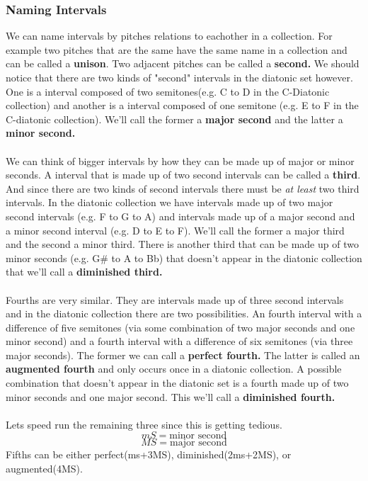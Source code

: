 \documentclass{article}
\begin{document}
\subsubsection{Naming Intervals}
We can name intervals by pitches relations to eachother in a collection. For example two pitches that are the same have the same name in a collection and can be called a \textbf{unison}. Two adjacent pitches can be called a \textbf{second.} We should notice that there are two kinds of "second" intervals in the diatonic set however. One is a interval composed of two semitones(e.g. C to D in the C-Diatonic collection) and another is a interval composed of one semitone (e.g. E to F in the C-diatonic collection). We'll call the former a \textbf{major second} and the latter a \textbf{minor second.}\\
\\We can think of bigger intervals by how they can be made up of major or minor seconds. A interval that is made up of two second intervals can be called a \textbf{third}. And since there are two kinds of second intervals there must be \textit{at least} two third intervals. In the diatonic collection we have intervals made up of two major second intervals (e.g. F to G to A) and intervals made up of a major second and a minor second interval (e.g. D to E to F). We'll call the former a major third and the second a minor third. There is another third that can be made up of two minor seconds (e.g. G\# to A to Bb) that doesn't appear in the diatonic collection that we'll call a \textbf{diminished third.}\\\\
Fourths are very similar. They are intervals made up of three second intervals and in the diatonic collection there are two possibilities. An fourth interval with a difference of five semitones (via some combination of two major seconds and one minor second) and a fourth interval with a difference of six semitones (via three major seconds). The former we can call a \textbf{perfect fourth.} The latter is called an \textbf{augmented fourth} and only occurs once in a diatonic collection. A possible combination that doesn't appear in the diatonic set is a fourth made up of two minor seconds and one major second. This we'll call a \textbf{diminished fourth.}\\\\
Lets speed run the remaining three since this is getting tedious.
$$mS=\text{minor second}$$
$$MS=\text{major second}$$
Fifths can be either perfect(ms+3MS), diminished(2ms+2MS), or augmented(4MS).\\
\end{document}
